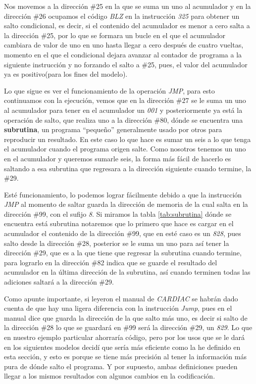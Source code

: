 \documentclass[letterpaper,12pt,oneside]{book}
\begin{document}
	Nos	movemos a la dirección \#25 en la que se suma un uno al acumulador y en la dirección \#26 ocupamos el código 
	\textit{BLZ} en la instrucción \textit{325} para obtener un salto condicional, es decir, si el contenido del acumulador es menor a cero salta a la 
	dirección \#25, por lo que se formara
	un bucle en el que el acumulador cambiara de valor de uno en uno hasta llegar a cero después de cuatro vueltas, momento en el que el condicional 
	dejara avanzar al contador de programa a la siguiente instrucción y no forzando el salto a \#25, pues, el valor del acumulador ya es
	positivo(para los fines del modelo).
	
	
	Lo que sigue es ver el funcionamiento de la operación \textit{JMP}, para esto continuamos con la ejecución, vemos que en la dirección
	\#27 se le suma un uno al acumulador para tener en el acumulador un \textit{001} y posteriormente ya está la operación
	de salto, que realiza uno a
	la dirección \#80, dónde se encuentra
	una \textbf{subrutina}, un programa ``pequeño'' generalmente usado por otros para reproducir un resultado. En este caso lo que hace
	es sumar un seis a lo que tenga el acumulador cuando el programa origen salte. Como nosotros tenemos un
	uno en el acumulador y queremos sumarle seis, la forma más fácil de hacerlo es saltando a esa subrutina que regresara a la dirección
	siguiente cuando termine, la \#29.
	
	Esté funcionamiento, lo podemos lograr fácilmente debido a que la instrucción \textit{JMP} al momento de saltar guarda la 
	dirección de memoria de la cual salta en la dirección \#99, con el sufijo \textit{8}. Si miramos la tabla \ref{tab:subrutina} dónde se encuentra
	está subrutina notaremos que lo primero que hace es cargar en el acumulador el contenido de la dirección \#99, que en
	esté caso es un \textit{828}, pues salto desde la dirección \#28, posterior se le suma un uno
	para así tener la dirección \#29, que es a la que tiene  que regresar la subrutina cuando termine, para lograrlo en la dirección
	\#82 indica que se guarde el resultado del acumulador en la última dirección de la subrutina, así cuando terminen todas las adiciones
	saltará a la dirección \#29.
	
	Como apunte importante, si leyeron el manual
	de \textit{CARDIAC} se habrán dado cuenta de que hay una ligera diferencia con la instrucción  \textit{Jump}, pues en el manual dice que guarda la dirección
	de la que salto más uno, es decir si salto de la dirección \#28 lo que se guardará en \#99 será la dirección \#29, un \textit{829}. Lo que en nuestro
	ejemplo particular ahorraría código, pero por los usos que se le dará en los siguientes modelos decidí que sería más eficiente como la he definido en esta sección, y esto
	es porque se tiene más precisión al tener la información más pura de dónde salto el programa. Y por supuesto, ambas definiciones pueden llegar a los
	mismos resultados con algunos cambios en la codificación.
	
\end{document}
